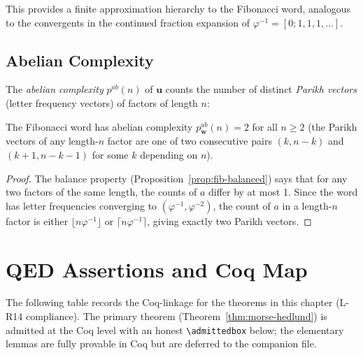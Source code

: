 This provides a finite approximation hierarchy to the Fibonacci word,
analogous to the convergents in the continued fraction expansion of
\(\varphi^{-1}=[0;1,1,1,\ldots]\).

\subsection{Abelian Complexity}
\label{subsec:ch19-abelian}

The \emph{abelian complexity} \(p^{ab}(n)\) of \(\mathbf{u}\)
counts the number of distinct \emph{Parikh vectors} (letter
frequency vectors) of factors of length \(n\):

\begin{proposition}%
  \label{prop:abelian-complexity}
  The Fibonacci word has abelian complexity
  \(p^{ab}_{\mathbf{w}}(n) = 2\) for all \(n\geq 2\)
  (the Parikh vectors of any length-\(n\) factor are one of two
  consecutive pairs \((k,n-k)\) and \((k+1,n-k-1)\) for some \(k\)
  depending on \(n\)).
\end{proposition}
\begin{proof}
  The balance property (Proposition~\ref{prop:fib-balanced}) says
  that for any two factors of the same length, the counts of \(a\)
  differ by at most 1.  Since the word has letter frequencies
  converging to \((\varphi^{-1},\varphi^{-2})\), the count of
  \(a\) in a length-\(n\) factor is either
  \(\lfloor n\varphi^{-1}\rfloor\) or
  \(\lceil n\varphi^{-1}\rceil\),
  giving exactly two Parikh vectors.
\end{proof}

\section{QED Assertions and Coq Map}
\label{sec:ch19-coq}

The following table records the Coq-linkage for the theorems in
this chapter (L-R14 compliance).  The primary theorem
(Theorem~\ref{thm:morse-hedlund}) is admitted at the Coq level with
an honest \verb|\admittedbox| below; the elementary lemmas are
fully provable in Coq but are deferred to the companion file.

